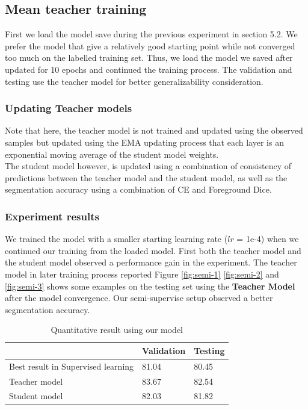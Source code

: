 \subsection{Mean teacher training}
First we load the model save during the previous experiment in section 5.2. We prefer the model that give a relatively good starting point while not converged too much on the labelled training set. Thus, we load the model we saved after updated for 10 epochs and continued the training process. The validation and testing use the teacher model for better generalizability consideration. \\

\subsubsection{Updating Teacher models}
Note that here, the teacher model is not trained and updated using the observed samples but updated using the EMA updating process that each layer is an exponential moving average of the student model weights.\\

The student model however, is updated using a combination of consistency of predictions between the teacher model and the student model, as well as the segmentation accuracy using a combination of CE and Foreground Dice.

\subsubsection{Experiment results}
We trained the model with a smaller starting learning rate ($lr$ = 1e-4) when we continued our training from the loaded model. First both the teacher model and the student model observed a performance gain in the experiment. The teacher model in later training process reported
Figure \ref{fig:semi-1} \ref{fig:semi-2} and \ref{fig:semi-3} shows some examples on the testing set using the \textbf{Teacher Model} after the model convergence. Our semi-supervise setup observed a better segmentation accuracy.

\begin{table}[h]
\centering
\begin{tabular}{lll}
\hline
\hline
                                   & Validation & Testing \\
\hline
Best result in Supervised learning & 81.04      & 80.45   \\
Teacher model                      & 83.67      & 82.54   \\
Student model                      & 82.03      & 81.82  \\
\hline
\end{tabular}
\caption{Quantitative result using our model}
\label{tab:semi-table}
\end{table}


